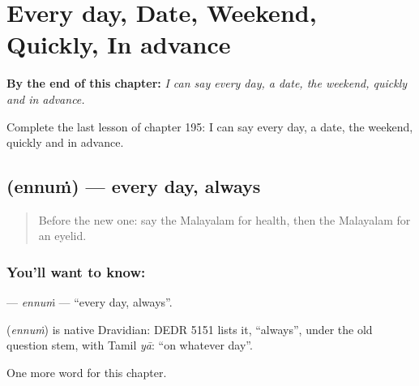 
\chapter{Every day, Date, Weekend, Quickly, In advance}
\label{ch:ml-every-day-date-weekend-quickly-in-advance}

\begin{chapteropening}
\textbf{By the end of this chapter:} \emph{I can say every day, a date, the weekend, quickly and in advance.}

Complete the last lesson of chapter 195: I can say every day, a date, the weekend, quickly and in advance.
\end{chapteropening}

\section[\texorpdfstring{\ml{എന്നും} (ennuṁ)}{എന്നും (ennuṁ)}]{ (ennuṁ) — every day, always}

\label{lesson:ML-C195-ennum}



\begin{quote}
Before the new one: say the Malayalam for health, then the Malayalam for an eyelid.
\end{quote}

\subsection*{You'll want to know: }
\textbf{} — \emph{ennuṁ} — \textquotedblleft{}every day, always\textquotedblright{}.

\begin{cousinweb}
\textbf{} (\emph{ennuṁ}) is native Dravidian: DEDR 5151 lists it, \textquotedblleft{}always\textquotedblright{}, under the old question stem, with Tamil \emph{yā}: \textquotedblleft{}on whatever day\textquotedblright{}.
\end{cousinweb}

\begin{grammarlens}[title={What you've built}]
One more word for this chapter.
\end{grammarlens}

